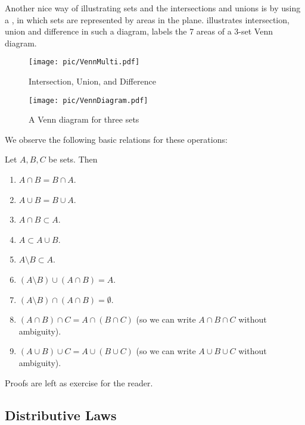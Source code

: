 Another nice way of illustrating sets and the intersections and unions
is by using a , in which sets are represented by areas in the plane.
 illustrates intersection, union and difference in
such a diagram,  labels the 7 areas of a 3-set Venn
diagram.

\begin{figure}[t]
\begin{center}
\texttt{[image: pic/VennMulti.pdf]}
\end{center}
\caption{Intersection, Union, and Difference}
\label{figvennmulti}
\end{figure}

\begin{figure}[t]
\begin{center}
\texttt{[image: pic/VennDiagram.pdf]}
\end{center}
\caption{A Venn diagram for three sets}
\label{figvenndiag}
\end{figure}

We observe the following basic relations for these operations:
\begin{lemma}
Let $A,B,C$ be sets. Then
\begin{enumerate}
\item $A\cap B=B\cap A$.
\item $A\cup B=B\cup A$.
\item $A\cap B\subset A$.
\item $A\subset A\cup B$.
\item $A\setminus B\subset A$.
\item $(A\setminus B)\cup (A\cap B)=A$.
\item $(A\setminus B)\cap (A\cap B)=\emptyset$.
\item $(A\cap B)\cap C=A\cap (B\cap C)$ (so we can write $A\cap B\cap C$
without ambiguity).
\item $(A\cup B)\cup C=A\cup (B\cup C)$ (so we can write $A\cup B\cup C$
without ambiguity).
\end{enumerate}
\end{lemma}
Proofs are left as exercise for the reader.

\subsection{Distributive Laws}

